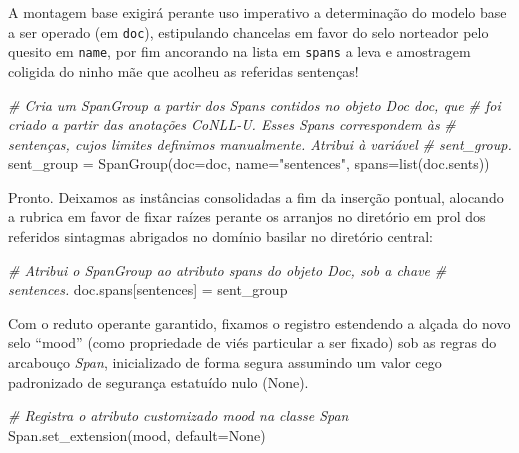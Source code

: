 \documentclass[
  brazilian,
]{article}
\newenvironment{Shaded}{}{}
\newcommand{\BuiltInTok}[1]{#1}
\newcommand{\CommentTok}[1]{\textcolor[rgb]{0.38,0.63,0.69}{\textit{#1}}}
\newcommand{\NormalTok}[1]{#1}
\newcommand{\OperatorTok}[1]{\textcolor[rgb]{0.40,0.40,0.40}{#1}}
\newcommand{\StringTok}[1]{\textcolor[rgb]{0.25,0.44,0.63}{#1}}
\newcommand{\VariableTok}[1]{\textcolor[rgb]{0.10,0.09,0.49}{#1}}
\begin{document}
A montagem base exigirá perante uso imperativo a determinação do modelo
base a ser operado (em \texttt{doc}), estipulando chancelas em favor do
selo norteador pelo quesito em \texttt{name}, por fim ancorando na lista
em \texttt{spans} a leva e amostragem coligida do ninho mãe que acolheu
as referidas sentenças!

\begin{Shaded}
\begin{Highlighting}[]
\CommentTok{\# Cria um SpanGroup a partir dos Spans contidos no objeto Doc \textquotesingle{}doc\textquotesingle{}, que}
\CommentTok{\# foi criado a partir das anotações CoNLL{-}U. Esses Spans correspondem às}
\CommentTok{\# sentenças, cujos limites definimos manualmente. Atribui à variável}
\CommentTok{\# \textquotesingle{}sent\_group\textquotesingle{}.}
\NormalTok{sent\_group }\OperatorTok{=}\NormalTok{ SpanGroup(doc}\OperatorTok{=}\NormalTok{doc, name}\OperatorTok{=}\StringTok{"sentences"}\NormalTok{, spans}\OperatorTok{=}\BuiltInTok{list}\NormalTok{(doc.sents))}
\end{Highlighting}
\end{Shaded}

Pronto. Deixamos as instâncias consolidadas a fim da inserção pontual,
alocando a rubrica em favor de fixar raízes perante os arranjos no
diretório em prol dos referidos sintagmas abrigados no domínio basilar
no diretório central:

\begin{Shaded}
\begin{Highlighting}[]
\CommentTok{\# Atribui o SpanGroup ao atributo \textquotesingle{}spans\textquotesingle{} do objeto Doc, sob a chave}
\CommentTok{\# \textquotesingle{}sentences\textquotesingle{}.}
\NormalTok{doc.spans[}\StringTok{\textquotesingle{}sentences\textquotesingle{}}\NormalTok{] }\OperatorTok{=}\NormalTok{ sent\_group}
\end{Highlighting}
\end{Shaded}

Com o reduto operante garantido, fixamos o registro estendendo a alçada
do novo selo ``mood'' (como propriedade de viés particular a ser fixado)
sob as regras do arcabouço \emph{Span}, inicializado de forma segura
assumindo um valor cego padronizado de segurança estatuído nulo (None).

\begin{Shaded}
\begin{Highlighting}[]
\CommentTok{\# Registra o atributo customizado \textquotesingle{}mood\textquotesingle{} na classe Span}
\NormalTok{Span.set\_extension(}\StringTok{\textquotesingle{}mood\textquotesingle{}}\NormalTok{, default}\OperatorTok{=}\VariableTok{None}\NormalTok{)}
\end{Highlighting}
\end{Shaded}
\end{document}
